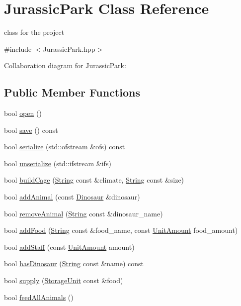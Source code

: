 \hypertarget{classJurassicPark}{}\section{Jurassic\+Park Class Reference}
\label{classJurassicPark}


class for the project  




{\ttfamily \#include $<$Jurassic\+Park.\+hpp$>$}



Collaboration diagram for Jurassic\+Park\+:
\subsection*{Public Member Functions}
\begin{DoxyCompactItemize}
\item 
bool \hyperlink{classJurassicPark_a45c3966b859c4925e001592b121f02c5}{open} ()
\item 
bool \hyperlink{classJurassicPark_a89a93a8592bad0dbfd3862bb404f6b80}{save} () const
\item 
bool \hyperlink{classJurassicPark_afd86a84e8f5916fa06b6e3766ea3f656}{serialize} (std\+::ofstream \&ofs) const
\item 
bool \hyperlink{classJurassicPark_a69199d5340680686ab8d8a11329431db}{unserialize} (std\+::ifstream \&ifs)
\item 
bool \hyperlink{classJurassicPark_a99a269ca6c92887ac396c9aad0e971d5}{build\+Cage} (\hyperlink{classString}{String} const \&climate, \hyperlink{classString}{String} const \&size)
\item 
bool \hyperlink{classJurassicPark_a6301a06db0d3c61b8823ed99585903f7}{add\+Animal} (const \hyperlink{classDinosaur}{Dinosaur} \&dinosaur)
\item 
bool \hyperlink{classJurassicPark_aac9409ebb9d2a782ffe0c74eac887b42}{remove\+Animal} (\hyperlink{classString}{String} const \&dinosaur\+\_\+name)
\item 
bool \hyperlink{classJurassicPark_a56eb91d1acfcf61925b9fe599d878b05}{add\+Food} (\hyperlink{classString}{String} const \&food\+\_\+name, const \hyperlink{StorageUnit_8hpp_a13b2ba6b0400e1aa0b57282bd1228f20}{Unit\+Amount} food\+\_\+amount)
\item 
bool \hyperlink{classJurassicPark_ae8e4c7c8073b6820dcef893b55cccb7e}{add\+Staff} (const \hyperlink{StorageUnit_8hpp_a13b2ba6b0400e1aa0b57282bd1228f20}{Unit\+Amount} amount)
\item 
bool \hyperlink{classJurassicPark_a6f5d45e9f908589e8946d6a0395cc06a}{has\+Dinosaur} (\hyperlink{classString}{String} const \&name) const
\item 
bool \hyperlink{classJurassicPark_a85762e64aeed4b9b145d48dff410e5f5}{supply} (\hyperlink{classStorageUnit}{Storage\+Unit} const \&food)
\item 
bool \hyperlink{classJurassicPark_af19a3800b00cf1d9b96d2e334bc95fb4}{feed\+All\+Animals} ()
\end{DoxyCompactItemize}
